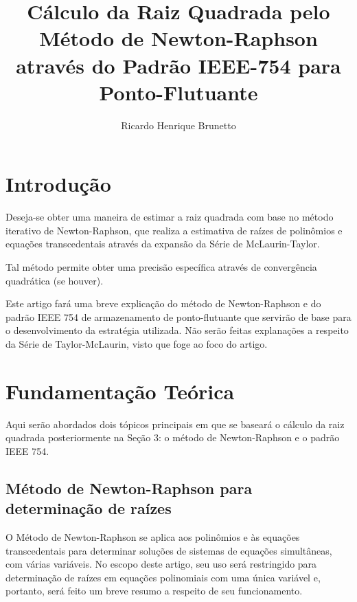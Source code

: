 

\sloppy

\title{Cálculo da Raiz Quadrada pelo Método de Newton-Raphson\\através do Padrão IEEE-754 para Ponto-Flutuante}

\author{Ricardo Henrique Brunetto}


\address{Departamento de Informática -- Universidade Estadual de Maringá (UEM)\\
	Maringá -- PR -- Brasil
}



	\maketitle

  \section{Introdução}
	Deseja-se obter uma maneira de estimar a raiz quadrada com base no método iterativo de Newton-Raphson, que realiza a
	estimativa de raízes de polinômios e equações transcedentais através da expansão da Série de McLaurin-Taylor.

	Tal método permite obter uma precisão específica através de convergência quadrática (se houver).

	Este artigo fará uma breve explicação do método de Newton-Raphson e do padrão IEEE 754 de armazenamento de ponto-flutuante
	que servirão de base para o desenvolvimento da estratégia utilizada. Não serão feitas explanações a respeito da Série de Taylor-McLaurin,
	visto que foge ao foco do artigo.

	\section{Fundamentação Teórica}
	\label{sec:fund_teor}
	Aqui serão abordados dois tópicos principais em que se baseará o cálculo da raiz quadrada posteriormente na Seção 3:
	o método de Newton-Raphson e o padrão IEEE 754.

	\subsection{Método de Newton-Raphson para determinação de raízes}
	O Método de Newton-Raphson se aplica aos polinômios e às equações transcedentais
	para determinar soluções de sistemas de equações simultâneas, com várias variáveis.
	No escopo deste artigo, seu uso será restringido para determinação de raízes em
	equações polinomiais com uma única variável e, portanto, será feito um breve resumo
	a respeito de seu funcionamento.

